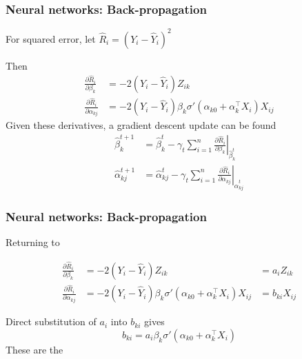 \documentclass[12pt]{beamer}
\newcommand{\parenthetical}[2]{#1  \scriptstyle \alr{( #2)}}
\begin{document}
\begin{frame}[fragile]
\frametitle{Neural networks: Back-propagation}
For squared error, let $\hat{R}_i = (Y_i - \hat{Y}_i)^2$

\vsp
Then
\begin{align*}
\frac{\partial \hat{R}_i}{\partial \beta_k} 
& = -2(Y_i - \hat{Y}_i)Z_{ik} \\
\frac{\partial \hat{R}_i}{\partial \alpha_{kj}}  
& = -2(Y_i - \hat{Y}_i)\beta_k \sigma'(\alpha_{k0} + \alpha_k^{\top} X_i)X_{ij}
\end{align*}
Given these derivatives, a gradient descent update can be found
\begin{align*}
\hat{\beta}_k^{t+1} 
& = 
\hat{\beta}_k^{t} - \gamma_t \sum_{i=1}^n \left. \frac{\partial \hat{R}_i}{\partial \beta_k} \right|_{\hat{\beta}_k^{t}} \\
\hat{\alpha}_{kj}^{t+1} 
& = 
\hat{\alpha}_{kj}^{t}  - \gamma_t \sum_{i=1}^n \left. \frac{\partial \hat{R}_i}{\partial \alpha_{kj}} \right|_{\hat{\alpha}_{kj}^{t}} 
\end{align*}
\end{frame}

\begin{frame}[fragile]
\frametitle{Neural networks: Back-propagation}
Returning to 

\begin{align*}
\frac{\partial \hat{R}_i}{\partial \beta_k} 
& = -2(Y_i - \hat{Y}_i)Z_{ik} & = a_i Z_{ik}
\\
\frac{\partial \hat{R}_i}{\partial \alpha_{kj}}  
& = -2(Y_i - \hat{Y}_i)\beta_k \sigma'(\alpha_{k0} + \alpha_k^{\top} X_i)X_{ij} &  =  b_{ki} X_{ij}
\end{align*}
\vsp

Direct substitution of $a_i$ into $b_{ki}$ gives 
\[
b_{ki} = a_i \beta_k \sigma'(\alpha_{k0} + \alpha_k^{\top} X_i)
\]
These are the 
\end{frame}
%
\end{document}
